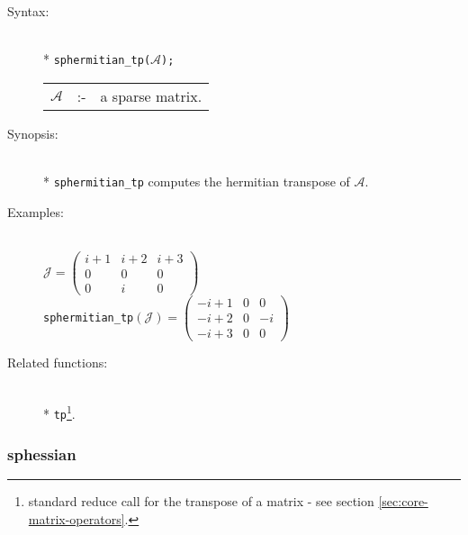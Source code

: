 \begin{description}
\item[Syntax:]\mbox{}\\*
\texttt{sphermitian\_tp($\mathcal{A}$);}\\[2mm]
\begin{tabular}{l l l}
$\mathcal{A}$ &:-& a sparse matrix.
\end{tabular}

\item[Synopsis:]\mbox{}\\*
                \texttt{sphermitian\_tp} computes the hermitian transpose of
                $\mathcal{A}$.

\item[Examples:]\mbox{}\\
\(\mathcal{J} = \begin{pmatrix} i+1 & i+2 & i+3 \\ 0 & 0 & 0 \\ 0 & i & 0 \end{pmatrix}\) \\[2mm]
\texttt{sphermitian\_tp}\((\mathcal{J}) =
\begin{pmatrix} -i+1 & 0 & 0 \\ -i+2 & 0 & -i \\-i+3 & 0 & 0\end{pmatrix}\)

\item[Related functions:]\mbox{}\\*
\texttt{tp}\footnote{standard reduce call for the
transpose of a matrix - see section \protect\ref{sec:core-matrix-operators}.}.
\end{description}

\subsubsection{sphessian}
\label{sparse:sphessian}

